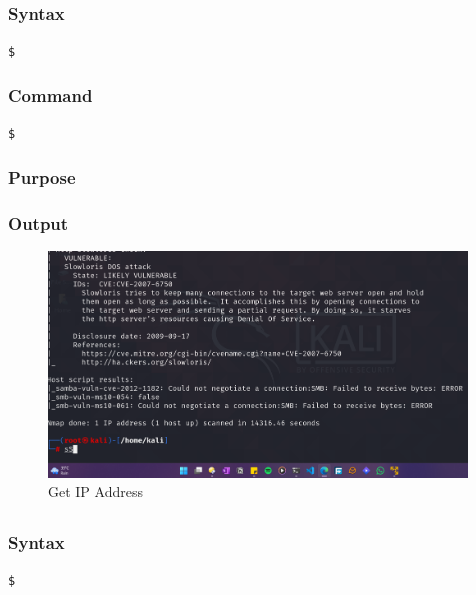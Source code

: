 \documentclass[11pt]{article}
\begin{document}
\subsection{}

\subsubsection*{Syntax}
\begin{verbatim}
$
\end{verbatim}

\subsubsection*{Command}
\begin{verbatim}
$
\end{verbatim}

\subsubsection*{Purpose}

\subsubsection*{Output}
\begin{figure}[H]
    \centering
    \includegraphics[width=0.99\textwidth]{a3_ss (15).png}
    \caption{Get IP Address}
    \label{fig:1}
\end{figure}
\subsection{}

\subsubsection*{Syntax}
\begin{verbatim}
$
\end{verbatim}
\end{document}
